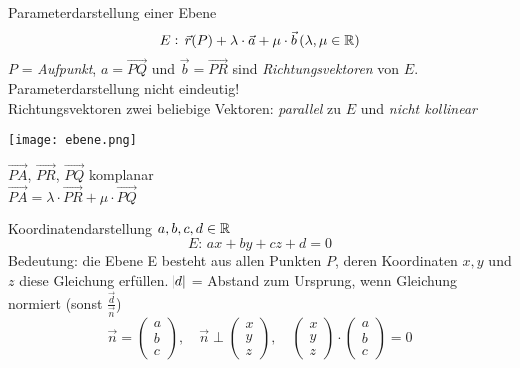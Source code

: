 \begin{minipage}{0.6\linewidth}
\begin{definition}{Parameterdarstellung} einer Ebene
    $$E:\,\vec{r}(P)+\lambda\cdot\vec{a}+\mu\cdot\vec{b}\, (\lambda,\mu\in\mathbb{R})$$
    $P$ = \textit{Aufpunkt}, $a=\overrightarrow{PQ}$ und 
    $\vec{b}=\overrightarrow{PR}$ sind \textit{Richtungsvektoren} von $E$.\\

    Parameterdarstellung nicht eindeutig!\\ Richtungsvektoren zwei beliebige
    Vektoren: \textit{parallel} zu $E$ und \textit{nicht kollinear}
\end{definition}
\end{minipage}
\begin{minipage}{0.4\linewidth}
    \begin{center}
    \texttt{[image: ebene.png]}
    \end{center}
    $\overrightarrow{PA}$, $\overrightarrow{PR}$, $\overrightarrow{PQ}$ komplanar\\

    $\overrightarrow{PA} = \lambda \cdot \overrightarrow{PR} + \mu \cdot \overrightarrow{PQ}$
\end{minipage}


\begin{definition}{Koordinatendarstellung} $a,b,c,d\in \mathbb{R}$
    $$E:\,ax+by+cz+d=0$$
    Bedeutung: die Ebene E besteht aus allen Punkten $P$, deren Koordinaten
    $x, y$ und $z$ diese Gleichung erfüllen.
    $\abs{d}$ = Abstand zum Ursprung, wenn Gleichung normiert
    (sonst $\frac{\vec{d}}{\vec{n}}$)
    {\small
    $$\vec{n} = \begin{pmatrix} a \\ b \\ c \end{pmatrix}, \quad
    \vec{n} \perp \begin{pmatrix} x \\ y \\ z \end{pmatrix}, \quad
    \begin{pmatrix} x \\ y \\ z \end{pmatrix} \cdot \begin{pmatrix} a \\ b \\ c \end{pmatrix} = 0$$
    }
\end{definition}

